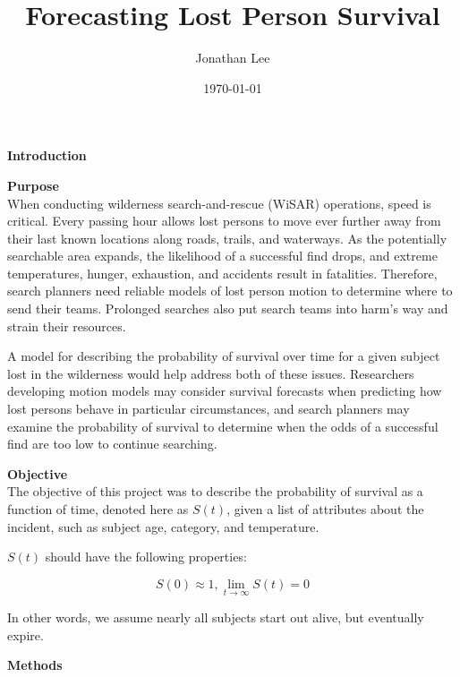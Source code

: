 \documentclass[serif,final]{beamer}
\title{Forecasting Lost Person Survival}
\author{Jonathan Lee}
\institute{TJHSST Computer Systems Lab}
\date{\today}
\newcommand{\heading}[1]{{\large \textbf{#1}}\\}
\newcommand{\subheading}[1]{{\textbf{#1}}\\}
\begin{document}
  \justify

  \begin{frame}
    \titlepage

    \begin{multicols}{3}
      \heading{Introduction}

      \indent

      \subheading{Purpose}

      When conducting wilderness search-and-rescue (WiSAR) operations, speed is
      critical. Every passing hour allows lost persons to move ever further
      away from their last known locations along roads, trails, and waterways.
      As the potentially searchable area expands, the likelihood of a
      successful find drops, and extreme temperatures, hunger, exhaustion, and
      accidents result in fatalities. Therefore, search planners need reliable
      models of lost person motion to determine where to send their teams.
      Prolonged searches also put search teams into harm's way and strain their
      resources.

      \indent

      A model for describing the probability of survival over time for a given
      subject lost in the wilderness would help address both of these issues.
      Researchers developing motion models may consider survival forecasts when
      predicting how lost persons behave in particular circumstances, and
      search planners may examine the probability of survival to determine when
      the odds of a successful find are too low to continue searching.

      \indent

      \subheading{Objective}

      The objective of this project was to describe the probability of survival
      as a function of time, denoted here as $S(t)$, given a list of attributes
      about the incident, such as subject age, category, and temperature.

      \indent

      $S(t)$ should have the following properties:

      $$S(0) \approx 1, \lim_{t \to \infty} S(t) = 0$$

      In other words, we assume nearly all subjects start out alive, but
      eventually expire.

      \indent

      \vfill
      \columnbreak

      \heading{Methods}


\end{multicols}
\end{frame}
\end{document}

